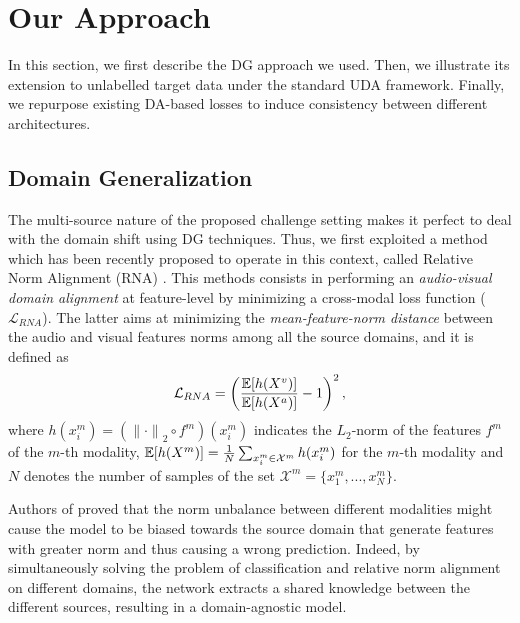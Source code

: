 \section{Our Approach}
In this section, we first describe the DG approach we used. %
Then, we illustrate its extension to unlabelled target data under the standard UDA framework. Finally, we repurpose existing DA-based losses to induce consistency between different architectures. 

\subsection{Domain Generalization}
The multi-source nature of the proposed challenge setting makes it perfect to deal with the domain shift using DG techniques. %
Thus, we first exploited a method which has been recently proposed to operate in this context, called Relative Norm Alignment (RNA) \cite{planamente2021crossdomain}.  %
This methods consists in performing an \textit{audio-visual domain alignment} at feature-level by minimizing a cross-modal loss function ($\mathcal{L}_{RNA}$). The latter aims at minimizing the \textit{mean-feature-norm distance} between the audio and visual features norms among all the source domains, %
and it is defined as
\begin{equation}\label{formula:rna_1}
    \mathcal{L}_{RNA}=\left(\frac{\operatorname{\mathbb{E}}[h(X^v)]}{\operatorname{\mathbb{E}}[h(X^a)]} - 1\right)^2,
\end{equation}
where $h(x^m_i)=({\lVert{ \cdot }\rVert}_2 \circ f^m)(x^m_i)$ indicates the $L_2$-norm of the features $f^m$ of the $m$-th modality, $\operatorname{\mathbb{E}}[h(X^m)]=\frac{1}{N}\sum_{x^m_i \in \mathcal{X}^m}h(x^m_i)$ for the $m$-th modality and $N$ denotes the number of samples of the set $\mathcal{X}^m=\{x^m_1,...,x^m_N\}$.

Authors of \cite{planamente2021crossdomain} proved that the norm unbalance between different modalities might cause the model to be biased towards the source domain that generate features with greater norm and thus causing a wrong prediction.  
Indeed, by simultaneously solving the problem of classification and relative norm alignment on different domains, the network extracts a shared knowledge between the different sources,  %
resulting in a domain-agnostic model. 

